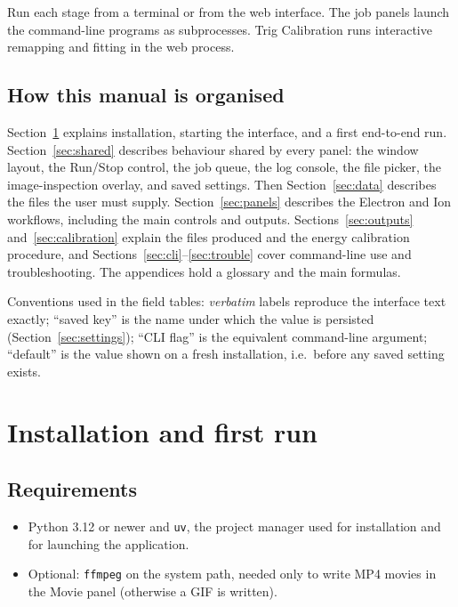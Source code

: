 \documentclass[11pt,a4paper]{article}
\newcommand{\code}[1]{\texttt{#1}}
\begin{document}
Run each stage from a terminal or from the web interface. The job panels
launch the command-line programs as subprocesses. Trig Calibration runs
interactive remapping and fitting in the web process.

\subsection{How this manual is organised}

Section~\ref{sec:install} explains installation, starting the interface, and
a first end-to-end run.
Section~\ref{sec:shared} describes behaviour shared by every panel: the
window layout, the Run/Stop control, the job queue, the log console, the file
picker, the image-inspection overlay, and saved settings. Then
Section~\ref{sec:data} describes the files the user must supply.
Section~\ref{sec:panels} describes the Electron and Ion workflows, including
the main controls and outputs. Sections~\ref{sec:outputs} and~\ref{sec:calibration}
explain the files produced and the energy calibration procedure, and
Sections~\ref{sec:cli}--\ref{sec:trouble} cover command-line use and
troubleshooting. The appendices hold a glossary and the main formulas.

Conventions used in the field tables: \emph{verbatim} labels reproduce the
interface text exactly; ``saved key'' is the name under which the value is
persisted (Section~\ref{sec:settings}); ``CLI flag'' is the equivalent
command-line argument; ``default'' is the value shown on a fresh
installation, i.e.\ before any saved setting exists.

\section{Installation and first run}
\label{sec:install}

\subsection{Requirements}

\begin{itemize}
  \item Python 3.12 or newer and \code{uv}, the project manager used for
        installation and for launching the application.
  \item Optional: \code{ffmpeg} on the system path, needed only to write
        MP4 movies in the Movie panel (otherwise a GIF is written).
\end{itemize}
\end{document}
